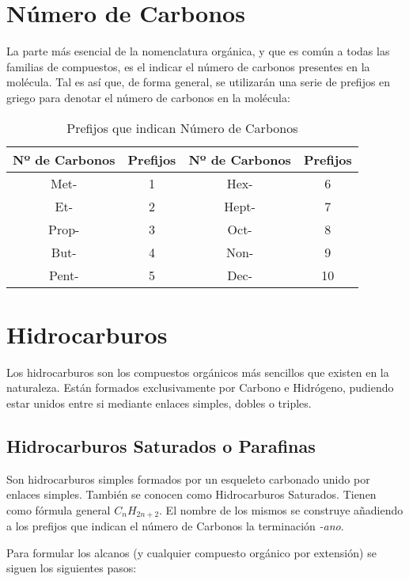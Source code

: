 \section{Número de Carbonos}
La parte más esencial de la nomenclatura orgánica, y que es común a todas las familias de compuestos, es el indicar el número de carbonos presentes en la molécula. Tal es así que, de forma general, se utilizarán una serie de prefijos en griego para denotar el número de carbonos en la molécula:
\begin{table}[h!]
	\centering
	\begin{tabular}{c|c||c|c}
		\textbf{Nº de Carbonos}&\textbf{Prefijos}&\textbf{Nº de Carbonos}&\textbf{Prefijos}\\ \hline
		Met-&1&Hex-&6\\
		Et-&2&Hept-&7\\
		Prop-&3&Oct-&8\\
		But-&4&Non-&9\\
		Pent-&5&Dec-&10\\ \hline
	\end{tabular}
\caption{Prefijos que indican Número de Carbonos}
\end{table}

\section{Hidrocarburos}
Los hidrocarburos son los compuestos orgánicos más sencillos que existen en la naturaleza. Están formados exclusivamente por Carbono e Hidrógeno, pudiendo estar unidos entre si mediante enlaces simples, dobles o triples.
\subsection{Hidrocarburos Saturados o Parafinas}
Son hidrocarburos simples formados por un esqueleto carbonado unido por enlaces simples. También se conocen como Hidrocarburos Saturados. Tienen como fórmula general $C_nH_{2n+2}$. El nombre de los mismos se construye añadiendo a los prefijos que indican el número de Carbonos la terminación \emph{-ano}.

\begin{figure}[h!]
	\centering
	\hspace{1cm}
\end{figure}
Para formular los alcanos (y cualquier compuesto orgánico por extensión) se siguen los siguientes pasos:\\

